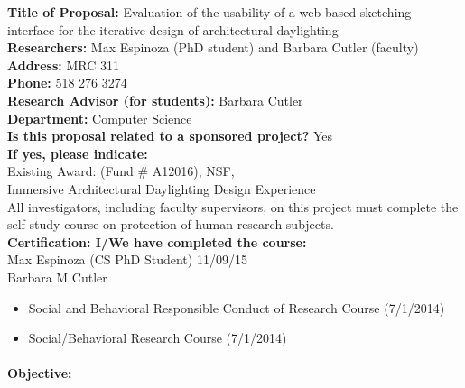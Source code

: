 \documentclass[12pt]{article}
\begin{document}
\noindent
{\bf Title of Proposal:} Evaluation of the usability of a web based 
sketching interface for the iterative design of architectural daylighting \\
{\bf Researchers:}   Max Espinoza (PhD student) and Barbara Cutler (faculty)\\
{\bf Address:}  MRC 311\\
{\bf Phone:} 518 276 3274\\ 
{\bf Research Advisor (for students):}  Barbara Cutler \\
{\bf Department:}  Computer Science \\
{\bf Is this proposal related to a sponsored project?}  Yes \\
{\bf If yes,  please indicate:}  \\
Existing Award: (Fund \# A12016), NSF, \\
Immersive Architectural Daylighting Design Experience \\

\noindent
All investigators, including faculty supervisors, on this project must
complete the self-study course on protection of human research
subjects. \\
{\bf Certification:  I/We have completed the course:} \\
Max Espinoza (CS PhD Student) 11/09/15 \\ 
Barbara M Cutler
\begin{itemize}
          \item Social and Behavioral Responsible Conduct of Research Course (7/1/2014)
          \item Social/Behavioral Research Course (7/1/2014)
\end{itemize}

\paragraph{Objective:}
\end{document}
